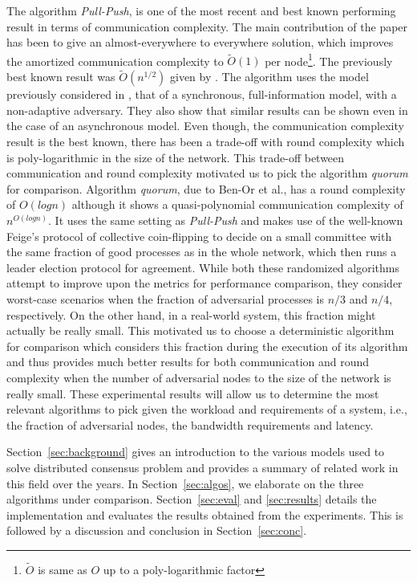The algorithm \textit{Pull-Push}, is one of the most recent and best known performing result in terms of communication complexity. The main contribution of the paper has been to give an almost-everywhere to everywhere solution, which improves the amortized communication complexity to $\tilde{O}(1)$ per node\footnote{$\tilde{O}$ is same as $O$ up to a poly-logarithmic factor}. The previously best known result was $\tilde{O}(n^{1/2})$ given by \cite{KLST11}. The algorithm uses the model previously considered in \cite{KLST11,KSSV06,BPV06,KS09}, that of a synchronous, full-information model, with a non-adaptive adversary. They also show that similar results can be shown even in the case of an asynchronous model. Even though, the communication complexity result is the best known, there has been a trade-off with round complexity which is poly-logarithmic in the size of the network. This trade-off between communication and round complexity motivated us to pick the algorithm \textit{quorum} for comparison. Algorithm \textit{quorum}, due to Ben-Or et al., has a round complexity of $O(logn)$ although it shows a quasi-polynomial communication complexity of $n^{O(logn)}$. It uses the same setting as \textit{Pull-Push} and makes use of the well-known Feige's protocol of collective coin-flipping to decide on a small committee with the same fraction of good processes as in the whole network, which then runs a leader election protocol for agreement. While both these randomized algorithms attempt to improve upon the metrics for performance comparison, they consider worst-case scenarios when the fraction of adversarial processes is $n/3$ and $n/4$, respectively. On the other hand, in a real-world system, this fraction might actually be really small. This motivated us to choose a deterministic algorithm for comparison which considers this fraction during the execution of its algorithm and thus provides much better results for both communication and round complexity when the number of adversarial nodes to the size of the network is really small. These experimental results will allow us to determine the most relevant algorithms to pick given the workload and requirements of a system, i.e., the fraction of adversarial nodes, the bandwidth requirements and latency. 


Section~\ref{sec:background} gives an introduction to the various models used to solve distributed consensus problem and provides a summary of related work in this field over the years. In Section~\ref{sec:algos}, we elaborate on the three algorithms under comparison. Section~\ref{sec:eval} and \ref{sec:results} details the implementation and evaluates the results obtained from the experiments. This is followed by a discussion and conclusion in Section~\ref{sec:conc}.

